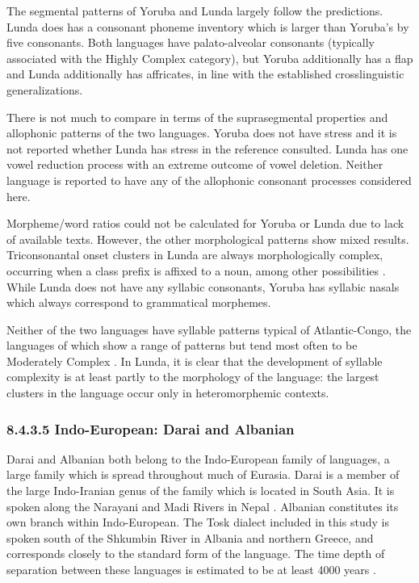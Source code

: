   The segmental patterns of Yoruba and Lunda largely follow the predictions. Lunda does has a consonant phoneme inventory which is larger than Yoruba’s by five consonants. Both languages have palato-alveolar consonants (typically associated with the Highly Complex category), but Yoruba additionally has a flap and Lunda additionally has affricates, in line with the established crosslinguistic generalizations.

  There is not much to compare in terms of the suprasegmental properties and allophonic patterns of the two languages. Yoruba does not have stress and it is not reported whether Lunda has stress in the reference consulted. Lunda has one vowel reduction process with an extreme outcome of vowel deletion. Neither language is reported to have any of the allophonic consonant processes considered here.

  Morpheme/word ratios could not be calculated for Yoruba or Lunda due to lack of available texts. However, the other morphological patterns show mixed results. Triconsonantal onset clusters in Lunda are always morphologically complex, occurring when a class prefix is affixed to a noun, among other possibilities \citep[23-24]{Kawasha2003}. While Lunda does not have any syllabic consonants, Yoruba has syllabic nasals which always correspond to grammatical morphemes.

  Neither of the two languages have syllable patterns typical of Atlantic-Congo, the languages of which show a range of patterns but tend most often to be Moderately Complex \citep{Maddieson2013a}. In Lunda, it is clear that the development of syllable complexity is at least partly to the morphology of the language: the largest clusters in the language occur only in heteromorphemic contexts.

\subsubsection{\textbf{8.4.3.5} \textbf{Indo-European:} \textbf{Darai} \textbf{and} \textbf{Albanian}}

  Darai and Albanian both belong to the Indo-European family of languages, a large family which is spread throughout much of Eurasia. Darai is a member of the large Indo-Iranian genus of the family which is located in South Asia. It is spoken along the Narayani and Madi Rivers in Nepal \citep{Dhakal2012}. Albanian constitutes its own branch within Indo-European. The Tosk dialect included in this study is spoken south of the Shkumbin River in Albania and northern Greece, and corresponds closely to the standard form of the language. The time depth of separation between these languages is estimated to be at least 4000 years \citep[146]{Garrett2006}.

